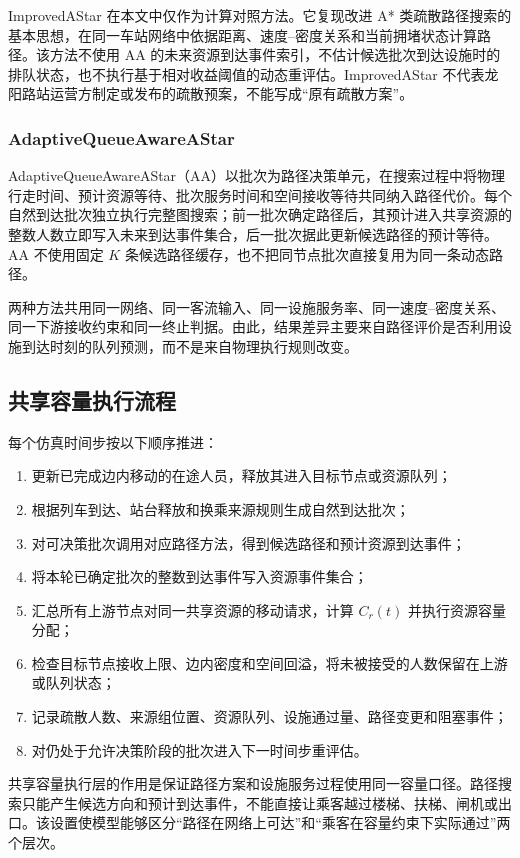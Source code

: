 \documentclass[UTF8,a4paper,12pt]{ctexart}
\begin{document}
ImprovedAStar 在本文中仅作为计算对照方法。它复现改进 A* 类疏散路径搜索的基本思想，在同一车站网络中依据距离、速度--密度关系和当前拥堵状态计算路径。该方法不使用 AA 的未来资源到达事件索引，不估计候选批次到达设施时的排队状态，也不执行基于相对收益阈值的动态重评估。ImprovedAStar 不代表龙阳路站运营方制定或发布的疏散预案，不能写成“原有疏散方案”。

\subsubsection{AdaptiveQueueAwareAStar}

AdaptiveQueueAwareAStar（AA）以批次为路径决策单元，在搜索过程中将物理行走时间、预计资源等待、批次服务时间和空间接收等待共同纳入路径代价。每个自然到达批次独立执行完整图搜索；前一批次确定路径后，其预计进入共享资源的整数人数立即写入未来到达事件集合，后一批次据此更新候选路径的预计等待。AA 不使用固定 \(K\) 条候选路径缓存，也不把同节点批次直接复用为同一条动态路径。

两种方法共用同一网络、同一客流输入、同一设施服务率、同一速度--密度关系、同一下游接收约束和同一终止判据。由此，结果差异主要来自路径评价是否利用设施到达时刻的队列预测，而不是来自物理执行规则改变。

\subsection{共享容量执行流程}

每个仿真时间步按以下顺序推进：
\begin{enumerate}
    \item 更新已完成边内移动的在途人员，释放其进入目标节点或资源队列；
    \item 根据列车到达、站台释放和换乘来源规则生成自然到达批次；
    \item 对可决策批次调用对应路径方法，得到候选路径和预计资源到达事件；
    \item 将本轮已确定批次的整数到达事件写入资源事件集合；
    \item 汇总所有上游节点对同一共享资源的移动请求，计算 \(C_r(t)\) 并执行资源容量分配；
    \item 检查目标节点接收上限、边内密度和空间回溢，将未被接受的人数保留在上游或队列状态；
    \item 记录疏散人数、来源组位置、资源队列、设施通过量、路径变更和阻塞事件；
    \item 对仍处于允许决策阶段的批次进入下一时间步重评估。
\end{enumerate}

共享容量执行层的作用是保证路径方案和设施服务过程使用同一容量口径。路径搜索只能产生候选方向和预计到达事件，不能直接让乘客越过楼梯、扶梯、闸机或出口。该设置使模型能够区分“路径在网络上可达”和“乘客在容量约束下实际通过”两个层次。
\end{document}
